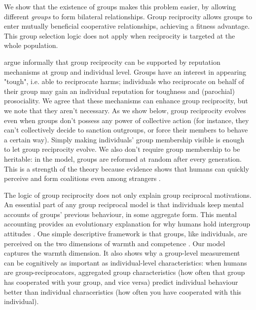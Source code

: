 \documentclass[12pt,a4paper]{article}
\begin{document}
We show that the existence of groups makes this problem easier, by allowing 
different \emph{groups} to form bilateral relationships. Group reciprocity 
allows groups to enter mutually beneficial cooperative relationships, achieving 
a fitness advantage. This group selection logic does not apply when reciprocity is 
targeted at the whole population.

\textcite{columbus2023parochial} argue informally that group reciprocity can
be supported by reputation mechanisms at group and individual level. Groups
have an interest in appearing "tough", i.e. able to reciprocate harms; individuals
who reciprocate on behalf of their group may gain an individual reputation for
toughness and (parochial) prosociality. We agree that these mechanisms can enhance
group reciprocity, but we note that they aren't necessary. As we show below,
group reciprocity evolves even when groups don't possess any power of collective 
action (for instance, they can't collectively decide to sanction outgroups, or 
force their members to behave a certain way). Simply making individuals' group 
membership visible is enough to let group reciprocity evolve. We also don't require
group membership to be heritable: in the model, groups are reformed at random
after every generation. This is a strength of the theory because evidence shows 
that humans can quickly perceive and form coalitions even among strangers 
\parencite{tajfel1971social,kurzban2001can,tooby2010groups}.

The logic of group reciprocity does not only explain group reciprocal motivations.
An essential part of any group reciprocal model is that individuals keep mental 
accounts of groups' previous behaviour, in some aggregate form. This mental
accounting provides an evolutionary explanation for why humans hold intergroup 
attitudes \parencite{brewer1985psychology,kurzban2001can}. One simple descriptive 
framework is that groups, like individuals, are perceived on the two dimensions of
warmth and competence \parencite{fiske2007universal}. Our model captures
the warmth dimension. It also shows why a group-level measurement can be cognitively
as important as individual-level characteristics: when humans are group-reciprocators,
aggregated group characteristics (how often that group has cooperated
with your group, and vice versa) predict individual behaviour better than individual
characeristics (how often you have cooperated with this individual).
\end{document}
